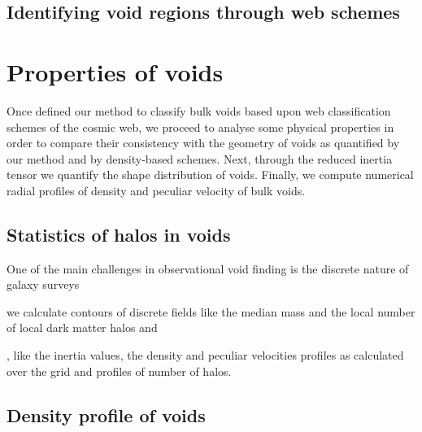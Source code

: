 \documentclass[a4,useAMS,usenatbib,usegraphicx]{latex/mn2e}
\begin{document}
\subsection{Identifying void regions through web schemes}
\label{subsec:identification}




\section{Properties of voids}
\label{sec:properties}


Once defined our method to classify bulk voids based upon web 
classification schemes of the cosmic web, we proceed to analyse some 
physical properties in order to compare their consistency with the 
geometry of voids as quantified by our method and by density-based schemes.
Next, through the reduced inertia tensor we quantify the shape distribution 
of voids. Finally, we compute numerical radial profiles of density and 
peculiar velocity of bulk voids.


\subsection{Statistics of halos in voids}
\label{subsec:shape_voids}


One of the main challenges in observational void finding is the discrete 
nature of galaxy surveys

 we calculate contours of discrete fields like the median mass and 
the local number of local dark matter halos and

, like the inertia values,
the density and peculiar velocities profiles as calculated over the grid 
and profiles of number of halos.


\subsection{Density profile of voids}
\label{subsec:density_voids}
\end{document}
